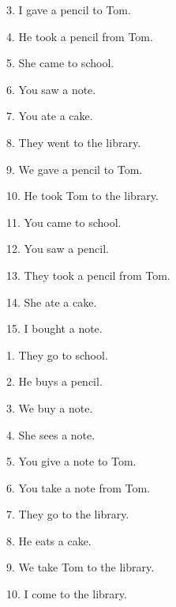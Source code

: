 \documentclass[uplatex,
paper=a4,
fontsize=18pt,
jafontsize=16pt,
number_of_lines=30,
line_length=30zh,
baselineskip=25pt,
]{jlreq}
\begin{document}
3.  I gave a pencil to Tom.

4.  He took a pencil from Tom.

5.  She came to school.

6.  You saw a note.

7.  You ate a cake.

8.  They went to the library.

9.  We gave a pencil to Tom.

10.  He took Tom to the library.

11.  You came to school.

12.  You saw a pencil.

13.  They took a pencil from Tom.

14.  She ate a cake.

15.  I bought a note.


\newpage
{}
1.  They go to school.

2.  He buys a pencil.

3.  We buy a note.

4.  She sees a note.

5.  You give a note to Tom.

6.  You take a note from Tom.

7.  They go to the library.

8.  He eats a cake.

9.  We take Tom to the library.

10.  I come to the library.
\end{document}
